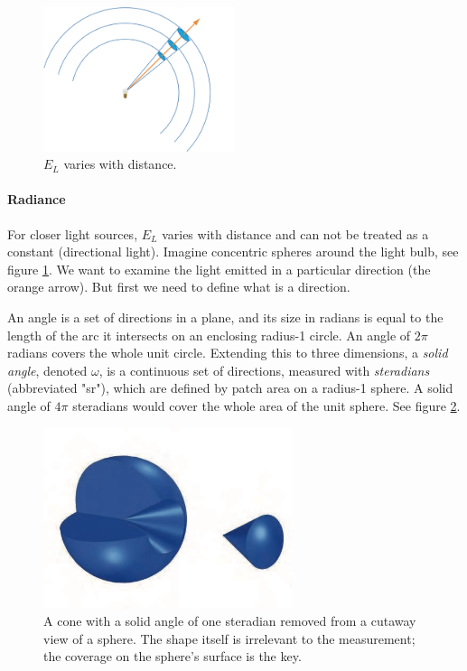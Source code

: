 \begin{figure}
\sidecaption
	\includegraphics[width=0.5\textwidth]{graphics/gi/radiance}
	\caption{$E_L$ varies with distance.}
	\label{f:radiance}
\end{figure}

\paragraph{\textbf{Radiance}} For closer light sources, $E_L$ varies with distance and can not be treated as a constant (directional light). Imagine concentric spheres around the light bulb, see figure \ref{f:radiance}.  We want to examine the light emitted in a particular direction (the orange arrow). But first we need to define what is a direction.

An angle is a set of directions in a plane, and its size in radians is equal to the length of the arc it intersects on an enclosing radius-1 circle. An angle of $2\pi$ radians covers the whole unit circle. Extending this to three dimensions, a \textit{solid angle}, denoted $\omega$, is a continuous set of directions, measured with \textit{steradians} (abbreviated "sr"), which are defined by patch area on a radius-1 sphere. A solid angle of $4\pi$ steradians would cover the whole area of the unit sphere. See figure \ref{f:solid-angle}.

\begin{figure}
\sidecaption
	\includegraphics[width=0.65\textwidth]{graphics/gi/Steradian}
	\caption{A cone with a solid angle of one steradian removed from a cutaway view of a sphere. The shape itself is irrelevant to the measurement; the coverage on the sphere's surface is the key.}
	\label{f:solid-angle}
\end{figure}

